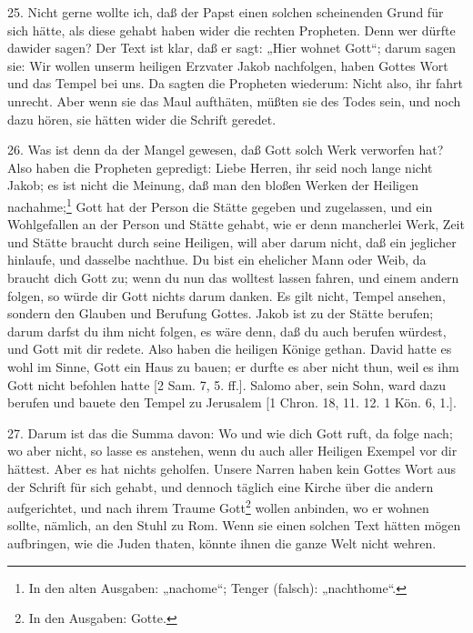 25. Nicht gerne wollte ich, daß der Papst einen solchen scheinenden Grund für sich hätte, als diese gehabt haben wider die rechten Propheten. Denn wer dürfte dawider sagen? Der Text ist klar, daß er sagt: „Hier wohnet Gott“; darum sagen sie: Wir wollen unserm heiligen Erzvater Jakob nachfolgen, haben Gottes Wort und das Tempel bei uns. Da sagten die Propheten wiederum: Nicht also, ihr fahrt unrecht. Aber wenn sie das Maul aufthäten, müßten sie des Todes sein, und noch dazu hören, sie hätten wider die Schrift geredet.

26. Was ist denn da der Mangel gewesen, daß Gott solch Werk verworfen hat? Also haben die Propheten gepredigt: Liebe Herren, ihr seid noch lange nicht Jakob; es ist nicht die Meinung, daß man den bloßen Werken der Heiligen nachahme;\footnote{In den alten Ausgaben: „nachome“; Tenger (falsch): „nachthome“.} Gott hat der Person die Stätte gegeben und zugelassen, und ein Wohlgefallen an der Person und Stätte gehabt, wie er denn mancherlei Werk, Zeit und Stätte braucht durch seine Heiligen, will aber darum nicht, daß ein jeglicher hinlaufe, und dasselbe nachthue. Du bist ein ehelicher Mann oder Weib, da braucht dich Gott zu; wenn du nun das wolltest lassen fahren, und einem andern folgen, so würde dir Gott nichts darum danken. Es gilt nicht, Tempel ansehen, sondern den Glauben und Berufung Gottes. Jakob ist zu der Stätte berufen; darum darfst du ihm nicht folgen, es wäre denn, daß du auch berufen würdest, und Gott mit dir redete. Also haben die heiligen Könige gethan. David hatte es wohl im Sinne, Gott ein Haus zu bauen; er durfte es aber nicht thun, weil es ihm Gott nicht befohlen hatte [2 Sam. 7, 5. ff.]. Salomo aber, sein Sohn, ward dazu berufen und bauete den Tempel zu Jerusalem [1 Chron. 18, 11. 12. 1 Kön. 6, 1.].

27. Darum ist das die Summa davon: Wo und wie dich Gott ruft, da folge nach; wo aber nicht, so lasse es anstehen, wenn du auch aller Heiligen Exempel vor dir hättest. Aber es hat nichts geholfen. Unsere Narren haben kein Gottes Wort aus der Schrift für sich gehabt, und dennoch täglich eine Kirche über die andern aufgerichtet, und nach ihrem Traume Gott\footnote{In den Ausgaben: Gotte.} wollen anbinden, wo er wohnen sollte, nämlich, an den Stuhl zu Rom. Wenn sie einen solchen Text hätten mögen aufbringen, wie die Juden thaten, könnte ihnen die ganze Welt nicht wehren.

